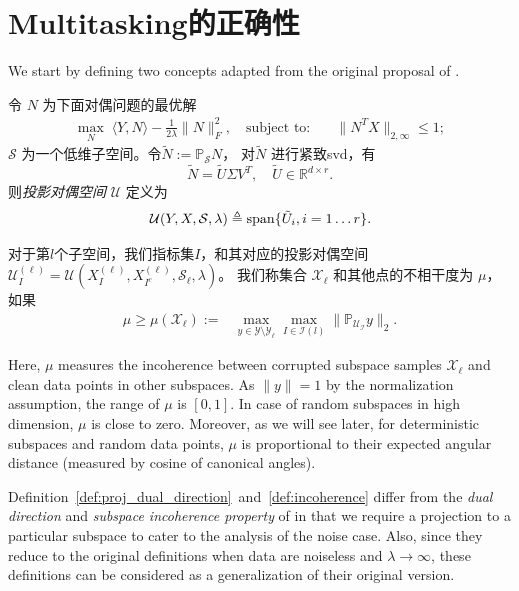 \documentclass[main.tex]{subfiles}
\begin{document}
\chapter{Multitasking的正确性}\label{chp:proof_multi}
We start by defining two concepts adapted from the original proposal of \cite{soltanolkotabi2011geometric}.
\begin{definition}[投影对偶空间]\label{def:proj_dual_direction}
  令 $N$ 为下面对偶问题的最优解
  \begin{align*}
    \max_{N} \; \langle Y, N \rangle - \frac{1}{2\lambda}\| N
    \|_F^2,\quad\text{subject to:}\quad &\|N^T X\|_{2, \infty} \leq 1;
  \end{align*}
  $\mathcal{S}$ 为一个低维子空间。令$ \tilde{N} := \mathbb{P}_{\mathcal{S}} N$，
  对$\tilde{N}$ 进行紧致svd，有
  $$ \tilde{N} = \tilde{U} \Sigma V^T, \quad \tilde{U} \in \mathbb{R}^{d \times r}. $$
  则{\em 投影对偶空间} $\mathcal{U}$ 定义为
  $$\mathcal{U}(Y,X,\mathcal{S},\lambda)\triangleq \mathrm{span} \{ \tilde{U}_i, i = 1\dots r \}.$$
\end{definition}


\begin{definition}[投影子空间的非相干性]\label{def:incoherence}
  对于第$l$个子空间，我们指标集$I$，和其对应的投影对偶空间
  $\mathcal{U}_I^{(\ell)}=\mathcal{U}(X_I^{(\ell)},X_{I^c}^{(\ell)},\mathcal{S}_{\ell},\lambda)$。
  我们称集合 $\mathcal{X}_{\ell}$ 和其他点的不相干度为 $\mu$，如果
  \begin{align*}
    \mu\geq \mu(\mathcal{X}_{\ell}) := &\max_{y\in \mathcal{Y}\setminus \mathcal{Y}_{\ell}}
    \max_{I \in \mathcal{I}(l)} \|\mathbb{P}_{\mathcal{U_I}} y\|_2.
  \end{align*}
\end{definition}

Here, $\mu$ measures the incoherence between corrupted subspace samples $\mathcal{X}_{\ell}$ and clean data points in other subspaces. As $\|y\|=1$ by the normalization assumption, the range of $\mu$ is $[0,1]$. In case of random subspaces in high dimension, $\mu$ is close to zero. Moreover, as we will see later, for deterministic subspaces and random data points, $\mu$ is proportional to their expected angular distance (measured by cosine of canonical angles).

Definition~\ref{def:proj_dual_direction}~and~\ref{def:incoherence} differ from the \emph{dual direction} and \emph{subspace incoherence property} of \cite{soltanolkotabi2011geometric} in that we require a projection to a particular subspace to cater to the analysis of the noise case. Also, since they reduce to the original definitions when data are noiseless and $\lambda\rightarrow \infty$, these definitions can be considered as a generalization of their original version.
\end{document}

